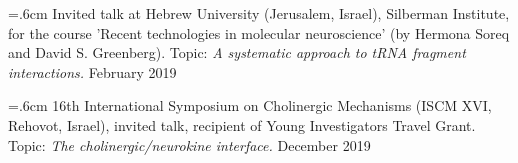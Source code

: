 \noindent \hangindent=.6cm Invited talk at Hebrew University (Jerusalem, Israel), Silberman Institute, for the course 'Recent technologies in molecular neuroscience' (by Hermona Soreq and David S. Greenberg). Topic: \emph{A systematic approach to tRNA fragment interactions.} February 2019

\noindent \hangindent=.6cm 16th International Symposium on Cholinergic Mechanisms (ISCM XVI, Rehovot, Israel), invited talk, recipient of Young Investigators Travel Grant. Topic: \emph{The cholinergic/neurokine interface.} December 2019

%
%
%
%
%
%
%
%
%
